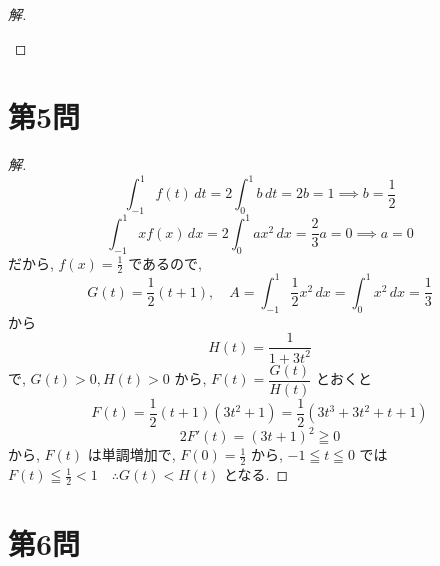 \documentclass[../main.tex]{subfiles}
\begin{document}
\begin{proof}[解]
\begin{center}
  \end{center}
\end{proof}

\section*{第5問}

\begin{proof}[解]
  \[
    \int_{-1}^1 f(t) \, dt = 2 \int_0^1 b \, dt = 2b = 1 \implies b = \frac{1}{2}
  \]
  \[
    \int_{-1}^1 x f(x) \, dx = 2 \int_0^1 a x^2 \, dx = \frac{2}{3} a = 0 \implies a = 0
  \]
  だから, $f(x) = \frac{1}{2}$ であるので,
  \[
    G(t) = \frac{1}{2} (t+1), \quad A = \int_{-1}^1 \frac{1}{2} x^2 \, dx = \int_0^1 x^2 \, dx = \frac{1}{3}
  \]
  から
  \[
    H(t) = \frac{1}{1 + 3t^2}
  \]
  で, $G(t) > 0, H(t) > 0$ から, $F(t) = \dfrac{G(t)}{H(t)}$ とおくと
  \[
    F(t) = \frac{1}{2}(t+1)(3t^2+1) = \frac{1}{2}(3t^3 + 3t^2 + t + 1)
  \]
  \[
    2F'(t) = (3t+1)^2 \geqq 0
  \]
  から, $F(t)$ は単調増加で, $F(0) = \frac{1}{2}$ から, $-1 \leqq t \leqq 0$ では $F(t) \leqq \frac{1}{2} < 1 \quad \therefore G(t) < H(t)$ となる.
\end{proof}

\section*{第6問}
\end{document}
